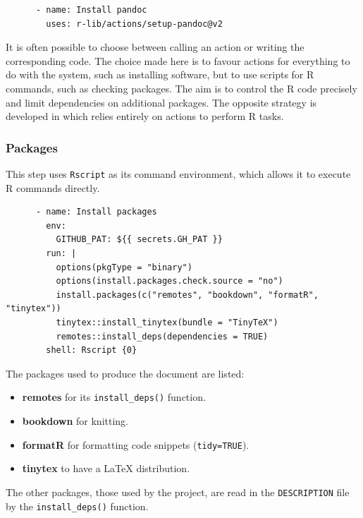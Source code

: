 \documentclass[
  12pt,
  american,
  a4paper,
  extrafontsizes,onecolumn,openright
  ]{memoir}
\providecommand{\tightlist}{%
  \setlength{\itemsep}{0pt}\setlength{\parskip}{0pt}}
\newlength{\rf}
\begin{document}
\begin{verbatim}
      - name: Install pandoc
        uses: r-lib/actions/setup-pandoc@v2
\end{verbatim}

It is often possible to choose between calling an action or writing the corresponding code.
The choice made here is to favour actions for everything to do with the system, such as installing software, but to use scripts for R commands, such as checking packages.
The aim is to control the R code precisely and limit dependencies on additional packages.
The opposite strategy is developed in \textcite{Wickham2023} which relies entirely on actions to perform R tasks.

\subsubsection{Packages}\label{sec:packages-ci}

This step uses \texttt{Rscript} as its command environment, which allows it to execute R commands directly.

\begin{verbatim}
      - name: Install packages
        env:
          GITHUB_PAT: ${{ secrets.GH_PAT }}
        run: |
          options(pkgType = "binary")
          options(install.packages.check.source = "no")
          install.packages(c("remotes", "bookdown", "formatR", "tinytex"))
          tinytex::install_tinytex(bundle = "TinyTeX")
          remotes::install_deps(dependencies = TRUE)
        shell: Rscript {0}
\end{verbatim}

The packages used to produce the document are listed:

\begin{itemize}
\tightlist
\item
  \textbf{remotes} for its \texttt{install\_deps()} function.
\item
  \textbf{bookdown} for knitting.
\item
  \textbf{formatR} for formatting code snippets (\texttt{tidy=TRUE}).
\item
  \textbf{tinytex} to have a LaTeX distribution.
\end{itemize}

The other packages, those used by the project, are read in the \texttt{DESCRIPTION} file by the \texttt{install\_deps()} function.
\end{document}
